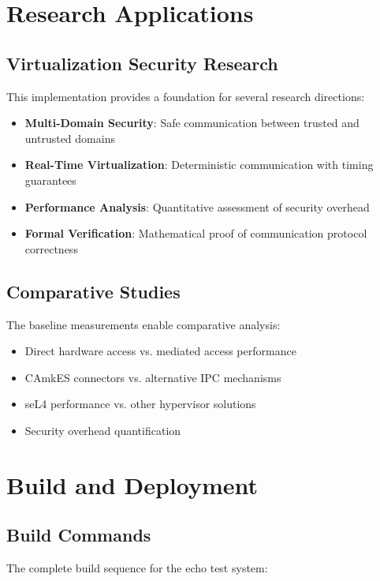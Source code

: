\documentclass[12pt,a4paper]{article}
\begin{document}
\section{Research Applications}

\subsection{Virtualization Security Research}

This implementation provides a foundation for several research directions:

\begin{itemize}
\item \textbf{Multi-Domain Security}: Safe communication between trusted and untrusted domains
\item \textbf{Real-Time Virtualization}: Deterministic communication with timing guarantees
\item \textbf{Performance Analysis}: Quantitative assessment of security overhead
\item \textbf{Formal Verification}: Mathematical proof of communication protocol correctness
\end{itemize}

\subsection{Comparative Studies}

The baseline measurements enable comparative analysis:

\begin{itemize}
\item Direct hardware access vs. mediated access performance
\item CAmkES connectors vs. alternative IPC mechanisms
\item seL4 performance vs. other hypervisor solutions
\item Security overhead quantification
\end{itemize}

\section{Build and Deployment}

\subsection{Build Commands}

The complete build sequence for the echo test system:
\end{document}
